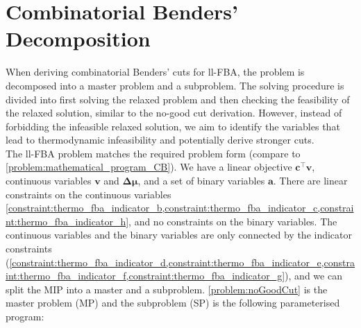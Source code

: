 \section{Combinatorial Benders' Decomposition} \label{section:cb}
When deriving combinatorial Benders' cuts for \textsf{ll-FBA}, the problem is decomposed into a master problem and a subproblem. The solving procedure is divided into first solving the relaxed problem and then checking the feasibility of the relaxed solution, similar to the no-good cut derivation. However, instead of forbidding the infeasible relaxed solution, we aim to identify the variables that lead to thermodynamic infeasibility and potentially derive stronger cuts.\\
The \textsf{ll-FBA} problem matches the required problem form (compare to \cref{problem:mathematical_program_CB}). We have a linear objective $\mathbf c^\intercal \mathbf v$, continuous variables $\mathbf v$ and $\boldsymbol{\Delta \mu}$, and a set of binary variables $\boldsymbol a$. There are linear constraints on the continuous variables \cref{constraint:thermo_fba_indicator_b,constraint:thermo_fba_indicator_c,constraint:thermo_fba_indicator_h}, and no constraints on the binary variables. The continuous variables and the binary variables are only connected by the indicator constraints (\cref{constraint:thermo_fba_indicator_d,constraint:thermo_fba_indicator_e,constraint:thermo_fba_indicator_f,constraint:thermo_fba_indicator_g}), and we can split the MIP into a master and a subproblem.
\vspace*{-\baselineskip}
\newpage
\cref{problem:noGoodCut} is the master problem (MP)
and the subproblem (SP) is the following parameterised program:
